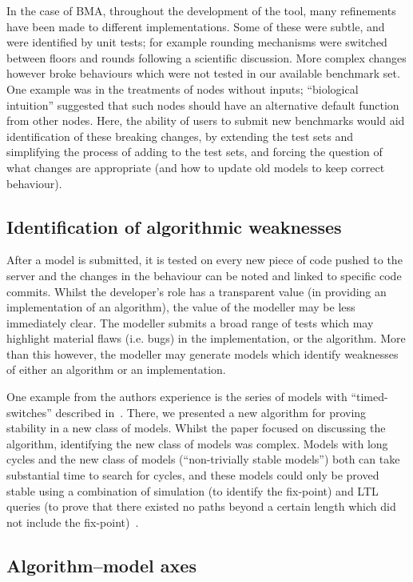 \documentclass{llncs}
\begin{document}
In the case of BMA, throughout the development of the tool, many
refinements have been made to different implementations. Some of these
were subtle, and were identified by unit tests; for example rounding
mechanisms were switched between floors and rounds following a
scientific discussion. More complex changes however broke behaviours
which were not tested in our available benchmark set. One example was
in the treatments of nodes without inputs; ``biological intuition''
suggested that such nodes should have an alternative default function
from other nodes. Here, the ability of users to submit new benchmarks
would aid identification of these breaking changes, by extending the
test sets and simplifying the process of adding to the test sets, and
forcing the question of what changes are appropriate (and how to
update old models to keep correct behaviour).


\subsection{Identification of algorithmic weaknesses}

After a model is submitted, it is tested on every new piece of code
pushed to the server and the changes in the behaviour can be noted and
linked to specific code commits. Whilst the developer's role has a
transparent value (in providing an implementation of an algorithm),
the value of the modeller may be less immediately clear. The modeller
submits a broad range of tests which may highlight material flaws
(i.e. bugs) in the implementation, or the algorithm. More than this
however, the modeller may generate models which identify weaknesses of
either an algorithm or an implementation.

One example from the authors experience is the series of models with
``timed-switches'' described in~\cite{cook-et-al:2014}. There, we presented a
new algorithm for proving stability in a new class of models. Whilst
the paper focused on discussing the algorithm, identifying the new
class of models was complex. Models with long cycles and the new class
of models (``non-trivially stable models'') both can take substantial
time to search for cycles, and these models could only be proved
stable using a combination of simulation (to identify the fix-point)
and LTL queries (to prove that there existed no paths beyond a certain
length which did not include the fix-point)~\cite{claessen-et-al:2013}.

\subsection{Algorithm--model axes}
\end{document}
